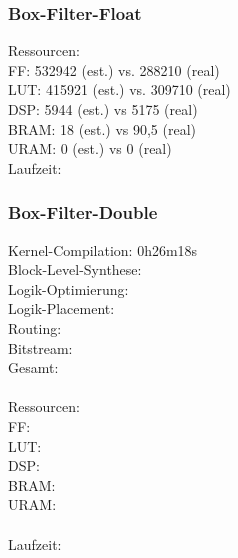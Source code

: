 \subsubsection{Box-Filter-Float}

Ressourcen:\\ 
FF: 532942 (est.) vs. 288210 (real)\\
LUT: 415921 (est.) vs. 309710 (real)\\
DSP: 5944 (est.) vs 5175 (real)\\
BRAM: 18 (est.) vs 90,5 (real)\\
URAM: 0 (est.) vs 0 (real)
\\
Laufzeit:

\subsubsection{Box-Filter-Double}

Kernel-Compilation:     0h26m18s\\
Block-Level-Synthese:   \\
Logik-Optimierung:      \\
Logik-Placement:        \\ 
Routing:                \\
Bitstream:              \\
Gesamt:                 \\
\\
Ressourcen:\\
FF:\\
LUT:\\
DSP:\\
BRAM:\\
URAM:\\
\\
Laufzeit:

